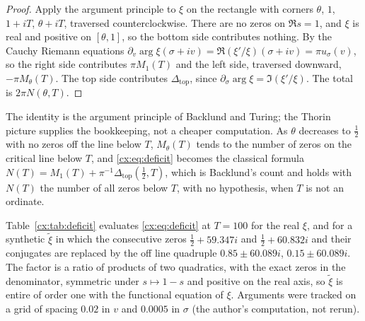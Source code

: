 \begin{proof}
Apply the argument principle to $\xi$ on the rectangle with corners $\theta$, $1$, $1+iT$, $\theta+iT$, traversed counterclockwise. There are no zeros on $\Re s=1$, and $\xi$ is real and positive on $[\theta,1]$, so the bottom side contributes nothing. By the Cauchy Riemann equations $\partial_v\arg\xi(\sigma+iv)=\Re(\xi'/\xi)(\sigma+iv)=\pi u_\sigma(v)$, so the right side contributes $\pi M_1(T)$ and the left side, traversed downward, $-\pi M_\theta(T)$. The top side contributes $\Delta_{\mathrm{top}}$, since $\partial_\sigma\arg\xi=\Im(\xi'/\xi)$. The total is $2\pi N(\theta,T)$.
\end{proof}

The identity is the argument principle of Backlund and Turing; the Thorin picture supplies the bookkeeping, not a cheaper computation. As $\theta$ decreases to $\tfrac12$ with no zeros off the line below $T$, $M_\theta(T)$ tends to the number of zeros on the critical line below $T$, and \eqref{cx:eq:deficit} becomes the classical formula $N(T)=M_1(T)+\pi^{-1}\Delta_{\mathrm{top}}(\tfrac12,T)$, which is Backlund's count and holds with $N(T)$ the number of all zeros below $T$, with no hypothesis, when $T$ is not an ordinate.

Table~\ref{cx:tab:deficit} evaluates \eqref{cx:eq:deficit} at $T=100$ for the real $\xi$, and for a synthetic $\tilde\xi$ in which the consecutive zeros $\tfrac12+59.347i$ and $\tfrac12+60.832i$ and their conjugates are replaced by the off line quadruple $0.85\pm60.089i$, $0.15\pm60.089i$. The factor is a ratio of products of two quadratics, with the exact zeros in the denominator, symmetric under $s\mapsto1-s$ and positive on the real axis, so $\tilde\xi$ is entire of order one with the functional equation of $\xi$. Arguments were tracked on a grid of spacing $0.02$ in $v$ and $0.0005$ in $\sigma$ (the author's computation, not rerun).

